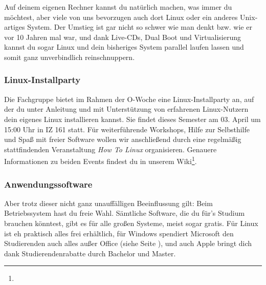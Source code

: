 	Auf deinem eigenen Rechner kannst du natürlich machen, was immer du möchtest, aber viele von uns bevorzugen auch dort Linux oder ein anderes Unix-artiges System. Der Umstieg ist gar nicht so schwer wie man denkt bzw. wie er vor 10 Jahren mal war, und dank Live-CDs, Dual Boot und Virtualisierung kannst du sogar Linux und dein bisheriges System parallel laufen lassen und somit ganz unverbindlich reinschnuppern.

        \subsubsection{Linux-Installparty}
	Die Fachgruppe bietet im Rahmen der O-Woche eine Linux-Installparty an, auf der du unter Anleitung und mit Unterstützung von erfahrenen Linux-Nutzern dein eigenes Linux installieren kannst. Sie findet dieses Semester am 03. April um 15:00 Uhr in IZ 161 statt. 
        Für weiterführende Workshops, Hilfe zur Selbsthilfe und Spaß mit freier Software wollen wir anschließend durch eine regelmäßig stattfindenden Veranstaltung \emph{How To Linux} organisieren. Genauere Informationen zu beiden Events findest du in unserem Wiki\footnote{}.

        \subsubsection{Anwendungssoftware}
			Aber trotz dieser nicht ganz unauffälligen Beeinflussung gilt: Beim Betriebssystem hast du freie Wahl. Sämtliche Software, die du für's Studium brauchen  könntest, gibt es für alle großen Systeme, meist sogar gratis. Für Linux ist eh  praktisch alles frei erhältlich, für Windows spendiert Microsoft den Studierenden auch alles außer Office (siehe Seite \pageref{msdnaa}), und auch Apple bringt dich dank Studierendenrabatte durch Bachelor und Master.
